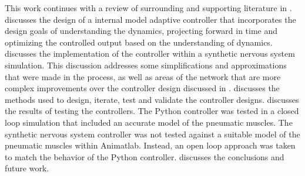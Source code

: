 This work continues with a review of surrounding and supporting literature in 
.  discusses the design of 
a internal model adaptive controller that incorporates the design goals of 
understanding the dynamics, projecting forward in time and optimizing the 
controlled output based on the understanding of dynamics.  discusses the implementation of the controller within a 
synthetic nervous system simulation. This discussion addresses some 
simplifications and approximations that were made in the process, as well as 
areas of the network that are more complex improvements over the controller 
design discussed in .  
discusses the methods used to design, iterate, test and validate the controller 
designs.  discusses the results of testing the controllers. The Python controller was tested in a closed loop simulation that included an accurate model of the pneumatic muscles. The synthetic nervous system controller was not tested against a suitable model of the pneumatic muscles within Animatlab. Instead, an open loop approach was taken to match the behavior of the Python controller. 
 discusses the conclusions and future work.
